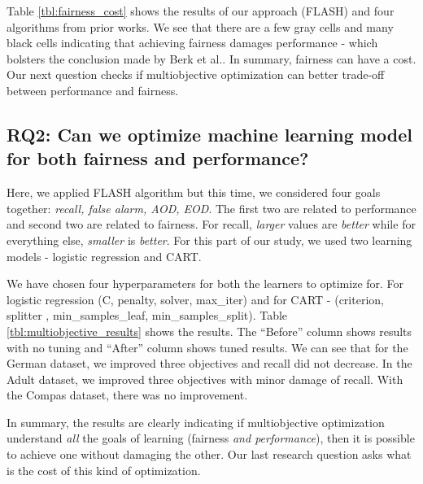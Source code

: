 \documentclass[10pt,conference,review]{IEEEtran}
\begin{document}
Table \ref{tbl:fairness_cost} shows the results of our approach (FLASH) and four algorithms from prior works. We see that there are a few gray cells and many black cells indicating that achieving fairness damages performance - which bolsters the conclusion made by Berk et al.\cite{berk2017convex}. In summary,  fairness can have a cost. Our next question checks if multiobjective optimization can better trade-off between performance and fairness.  

\subsection{RQ2: Can we optimize machine learning model for both fairness and performance?}

Here, we applied  FLASH algorithm but this time, we considered four goals together: \textit{recall, false alarm, AOD, EOD}. The first two are related to performance and second two are related to fairness. For
recall, {\em larger} values are {\em better} while for everything
else, {\em smaller} is {\em better}.
 For this part of our study, we used two learning models - logistic regression and CART. 
 
 We have chosen four hyperparameters for both the learners to optimize for. For logistic regression (C, penalty, solver, max\_iter) and for CART - (criterion, splitter , min\_samples\_leaf, min\_samples\_split). Table \ref{tbl:multiobjective_results} shows the results. The ``Before'' column shows results with no tuning and ``After'' column shows tuned results. We can see that for
 the German dataset, we improved three objectives and recall did not decrease. In the Adult dataset, we improved three objectives with minor damage of recall. 
 With the
 Compas dataset, there was no improvement. 
 
 In summary, the results are clearly indicating if  multiobjective  optimization understand {\em all} the goals of learning
 (fairness {\em and performance}), then it is possible to achieve one without
 damaging the other. Our last research question asks  what is the cost of this kind of optimization.
\end{document}
